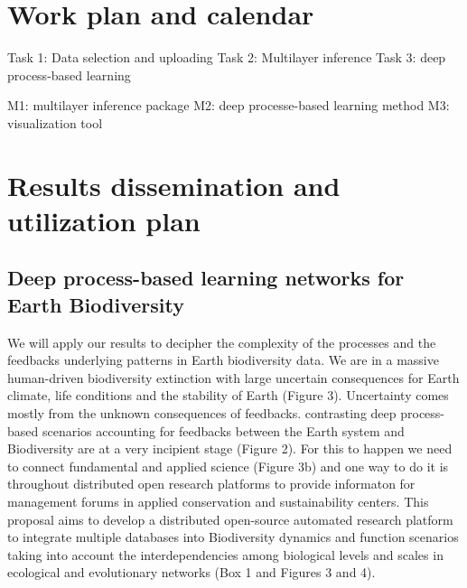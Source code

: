 \documentclass[authoryear,1p,12pt]{elsarticle}
\begin{document}
     
     
     \newpage
     \section{Work plan and calendar}

     
     Task 1: Data selection and uploading
     Task 2: Multilayer inference
     Task 3: deep process-based learning

     M1: multilayer inference package
     M2: deep processe-based learning method
     M3: visualization tool

     \newpage
     \section{Results dissemination and utilization plan}

     
     \subsection{Deep process-based learning networks for Earth
       Biodiversity}
     We will apply our results to decipher the complexity of the
     processes and the feedbacks underlying patterns in Earth
     biodiversity data. We are in a massive human-driven biodiversity
     extinction with large uncertain consequences for Earth climate,
     life conditions and the stability of Earth (Figure
     3). Uncertainty comes mostly from the unknown consequences of
     feedbacks.  contrasting deep process-based scenarios accounting
     for feedbacks between the Earth system and Biodiversity are at a
     very incipient stage (Figure 2). For this to happen we need to
     connect fundamental and applied science (Figure 3b) and one way
     to do it is throughout distributed open research platforms to
     provide informaton for management forums in applied conservation
     and sustainability centers. This proposal aims to develop a
     distributed open-source automated research platform to integrate
     multiple databases into Biodiversity dynamics and function
     scenarios taking into account the interdependencies among
     biological levels and scales in ecological and evolutionary
     networks (Box 1 and Figures 3 and 4).
\end{document}
